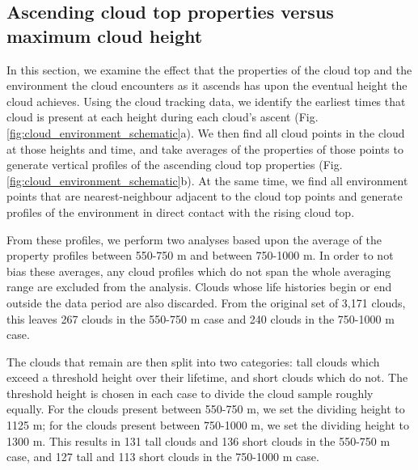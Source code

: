\documentclass[acp]{copernicus}
\begin{document}
\subsection{Ascending cloud top properties versus maximum cloud height}

In this section, we examine the effect that the properties of the cloud top and 
the environment the cloud encounters as it ascends has upon the eventual height 
the cloud achieves.  Using the cloud tracking data, we identify the earliest 
times that cloud is present at each height during each cloud's ascent 
(Fig. \ref{fig:cloud_environment_schematic}a).  We then find all cloud points 
in the cloud at those heights and time, and take averages of the properties of 
those points to generate vertical profiles of the ascending cloud top 
properties (Fig. \ref{fig:cloud_environment_schematic}b).  At the same time, 
we find all environment points that are nearest-neighbour adjacent to the cloud 
top points and generate profiles of the environment in direct contact with the 
rising cloud top.

From these profiles, we perform two analyses based upon the average of the 
property profiles between 550-750 m and between 750-1000 m.  In order to not 
bias these averages, any cloud profiles which do not span the whole averaging 
range are excluded from the analysis.  Clouds whose life histories begin or end 
outside the data period are also discarded.  From the original set of 3,171 
clouds, this leaves 267 clouds in the 550-750 m case and 240 clouds in the 
750-1000 m case.

The clouds that remain are then split into two categories: tall clouds which 
exceed a threshold height over their lifetime, and short clouds which do not.  
The threshold height is chosen in each case to divide the cloud sample roughly 
equally.  For the clouds present between 550-750 m, we set the dividing 
height to 1125 m; for the clouds present between 750-1000 m, we set the 
dividing height to 1300 m.  This results in 131 tall clouds and 136 short 
clouds in the 550-750 m case, and 127 tall and 113 short clouds in the 
750-1000 m case.
\end{document}

